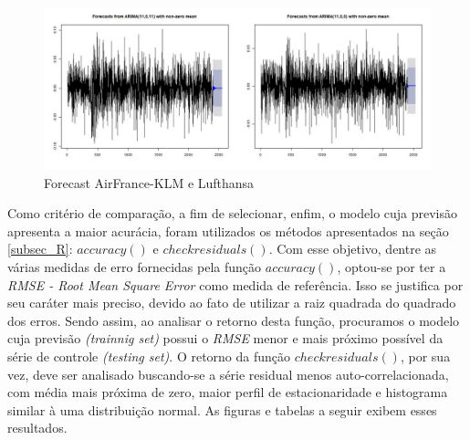\documentclass[12pt]{article}
\begin{document}
\begin{figure}[H]
	\centering
	\includegraphics[width=0.9\linewidth]{../Modelos/ForecastKLMLuft}
	\caption{Forecast AirFrance-KLM e Lufthansa}
	\label{fig:forecastklmluft}
\end{figure}


Como critério de comparação, a fim de selecionar, enfim, o modelo cuja previsão apresenta a maior acurácia, foram utilizados os métodos apresentados na seção \ref{subsec_R}: $accuracy()$ e $checkresiduals()$. Com esse objetivo, dentre as várias medidas de erro fornecidas pela função $accuracy()$, optou-se por ter a \textit{RMSE - Root Mean Square Error} como medida de referência. Isso se justifica por seu caráter mais preciso, devido ao fato de utilizar a raiz quadrada do quadrado dos erros. Sendo assim, ao analisar o retorno desta função, procuramos o modelo cuja previsão \textit{(trainnig set)} possui o \textit{RMSE} menor e mais próximo possível da série de controle \textit{(testing set)}. O retorno da função $checkresiduals()$, por sua vez, deve ser analisado buscando-se a série residual menos auto-correlacionada, com média mais próxima de zero, maior perfil de estacionaridade e histograma similar à uma distribuição normal. As figuras e tabelas a seguir exibem esses resultados.
\end{document}
